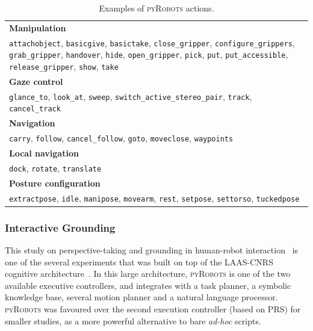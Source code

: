 \documentclass[a4paper, 10pt, conference]{ieeeconf}      %
\newcommand{\pyRobots}{\textsc{pyRobots}}
\begin{document}
\begin{table}[ht!]
\begin{center}
\begin{tabular}{p{}}
    \toprule
    {\bf Manipulation} \\
     {\tt attachobject}, {\tt basicgive}, {\tt basictake}, {\tt close\_gripper}, {\tt configure\_grippers}, {\tt grab\_gripper}, {\tt handover}, {\tt hide}, {\tt open\_gripper}, {\tt pick}, {\tt put}, {\tt put\_accessible}, {\tt release\_gripper}, {\tt show}, {\tt take} \\
     \midrule
    {\bf Gaze control} \\
     {\tt glance\_to}, {\tt look\_at}, {\tt sweep}, {\tt switch\_active\_stereo\_pair}, {\tt track}, {\tt cancel\_track} \\
     \midrule
    {\bf Navigation} \\
     {\tt carry}, {\tt follow}, {\tt cancel\_follow}, {\tt goto}, {\tt moveclose}, {\tt waypoints} \\
     \midrule
    {\bf Local navigation} \\
     {\tt dock}, {\tt rotate}, {\tt translate} \\
     \midrule
    {\bf Posture configuration} \\
     {\tt extractpose}, {\tt idle}, {\tt manipose}, {\tt movearm}, {\tt rest}, {\tt setpose}, {\tt settorso}, {\tt tuckedpose} \\
     \bottomrule
\end{tabular}
\end{center}
\caption{Examples of \pyRobots{} actions.}

\label{pyrobots_actions}
\end{table}

\subsubsection{Interactive Grounding} This study on perspective-taking and grounding
in human-robot interaction~\cite{lemaignan2013talking} is one of the several
experiments that was built on top of the LAAS-CNRS cognitive
architecture~\cite{lemaignan2014human}. In this large architecture, \pyRobots{}
is one of the two available executive controllers, and integrates with a task
planner, a symbolic knowledge base, several motion planner and a natural
language processor. \pyRobots{} was favoured over the second execution
controller (based on PRS) for smaller studies, as a more powerful alternative to
bare \textit{ad-hoc} scripts.
\end{document}
